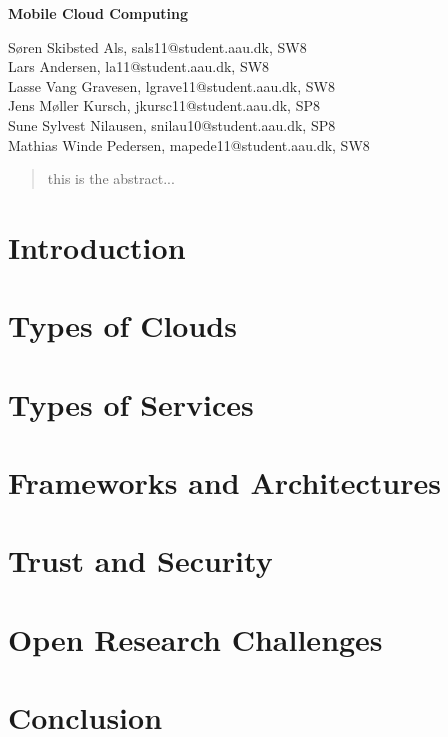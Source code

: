 \documentclass[12pt,a4paper]{article}
\begin{document}
\begin{center}
\bigskip\bigskip
{\Large\bf Mobile Cloud Computing\\}
\bigskip\bigskip


Søren Skibsted Als, sals11@student.aau.dk, SW8\\
Lars Andersen, la11@student.aau.dk, SW8\\
Lasse Vang Gravesen, lgrave11@student.aau.dk, SW8\\
Jens Møller Kursch, jkursc11@student.aau.dk, SP8\\
Sune Sylvest Nilausen, snilau10@student.aau.dk, SP8\\
Mathias Winde Pedersen, mapede11@student.aau.dk, SW8


\bigskip
\begin{abstract}
this is the abstract...
\end{abstract}

\thispagestyle{empty}
\end{center}


\titlepage

\thispagestyle{plain}


\section{Introduction}


\section{Types of Clouds}

\section{Types of Services}

\section{Frameworks and Architectures}

\section{Trust and Security}

\section{Open Research Challenges}

\section{Conclusion}

\newpage


\label{bib:mybiblio}
\end{document}
